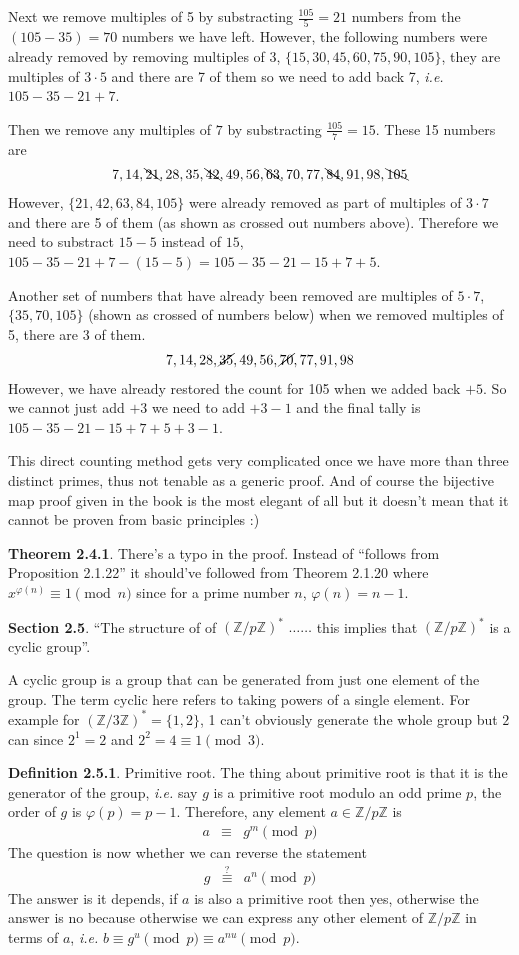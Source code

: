 \documentclass[aps,preprint,preprintnumbers,nofootinbib,showpacs,prd]{revtex4-1}
\newcommand{\ie}{{\it i.e.} }
\newcommand{\nbea}{\begin{eqnarray*}}
\newcommand{\neea}{\end{eqnarray*}}
\begin{document}
Next we remove multiples of 5 by substracting $\frac{105}{5} = 21$ numbers from the $(105 - 35) = 70$ numbers we have left. However, the following numbers were already removed by removing multiples of 3, $\{15, 30, 45, 60, 75, 90, 105\}$, they are multiples of $3 \cdot 5$ and there are 7 of them so we need to add back 7, \ie $105 - 35 - 21 + 7$.

Then we remove any multiples of $7$ by substracting $\frac{105}{7} = 15$. These 15 numbers are
%
\nbea
7,14,\bcancel{21},28,35,\bcancel{42},49,56,\bcancel{63},70,77,\bcancel{84},91,98,\bcancel{105}
\neea
%
However, $\{21,42,63,84,105\}$ were already removed as part of multiples of $3\cdot 7$ and there are 5 of them (as shown as crossed out numbers above). Therefore we need to substract $15 - 5$ instead of $15$, $105 - 35 - 21 +7 -(15 - 5) = 105 - 35 - 21 - 15 + 7 + 5$.

Another set of numbers that have already been removed are multiples of $5 \cdot 7$, $\{35,70,105\}$ (shown as crossed of numbers below) when we removed multiples of 5, there are 3 of them. 
%
\nbea
7,14,28,\cancel{35},49,56,\cancel{70},77,91,98
\neea
%
However, we have already restored the count for 105 when we added back $+5$. So we cannot just add $+3$ we need to add $+3 -1$ and the final tally is $105 - 35 - 21 -15 + 7 + 5 + 3 - 1$.

This direct counting method gets very complicated once we have more than three distinct primes, thus not tenable as a generic proof. And of course the bijective map proof given in the book is the most elegant of all but it doesn't mean that it cannot be proven from basic principles :) 

{\bf Theorem 2.4.1}. There's a typo in the proof. Instead of ``follows from Proposition 2.1.22'' it should've followed from Theorem 2.1.20 where $x^{\varphi(n)} \equiv 1 \pmod{n}$ since for a prime number $n$, $\varphi(n) = n-1$.

{\bf Section 2.5}. ``The structure of of $(\mathbb{Z}/p\mathbb{Z})^*$ $\dots \dots$ this implies that $(\mathbb{Z}/p\mathbb{Z})^*$ is a cyclic group''.

A cyclic group is a group that can be generated from just one element of the group. The term cyclic here refers to taking powers of a single element. For example for $(\mathbb{Z}/3\mathbb{Z})^* = \{1,2\}$, 1 can't obviously generate the whole group but $2$ can since $2^1 = 2$ and $2^2 = 4 \equiv 1 \pmod{3}$.

{\bf Definition 2.5.1}. Primitive root. The thing about primitive root is that it is the generator of the group, \ie say $g$ is a primitive root modulo an odd prime $p$, the order of $g$ is $\varphi(p) = p-1$. Therefore, any element $a \in \mathbb{Z}/p\mathbb{Z}$ is
%
\nbea
a & \equiv & g^m \pmod{p}
\neea
%
The question is now whether we can reverse the statement
%
\nbea
g & \stackrel{?}{\equiv} & a^n \pmod{p}
\neea
%
The answer is it depends, if $a$ is also a primitive root then yes, otherwise the answer is no because otherwise we can express any other element of $\mathbb{Z}/p\mathbb{Z}$ in terms of $a$, \ie $b \equiv g^u \pmod{p} \equiv a^{nu} \pmod{p}$.
\end{document}
